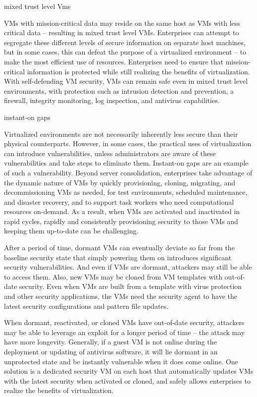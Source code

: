 mixed trust level Vms

VMs with mission-critical data may reside on the same host as VMs with less critical data – resulting in mixed trust level VMs. Enterprises can attempt to segregate these different levels of secure information on separate host machines, but in some cases, this can defeat the purpose of a virtualized environment – to make the most efficient use of resources. Enterprises need to ensure that mission-critical information is protected while still realizing the benefits of virtualization. With self-defending VM security, VMs can remain safe even in mixed trust level environments, with protection such as intrusion detection and prevention, a firewall, integrity monitoring, log inspection, and antivirus capabilities.

instant-on gaps

Virtualized environments are not necessarily inherently less secure than their physical counterparts. However, in some cases, the practical uses of virtualization can introduce vulnerabilities, unless administrators are aware of these vulnerabilities and take steps to eliminate them. Instant-on gaps are an example of such a vulnerability.
Beyond server consolidation, enterprises take advantage of the dynamic nature of VMs by quickly provisioning, cloning, migrating, and decommissioning VMs as needed, for test environments, scheduled maintenance, and disaster recovery, and to support task workers who need computational resources on-demand. As a result, when VMs are activated and inactivated in rapid cycles, rapidly and consistently provisioning security to those VMs and keeping them up-to-date can be challenging.

After a period of time, dormant VMs can eventually deviate so far from the baseline security state that simply powering them on introduces significant security vulnerabilities. And even if VMs are dormant, attackers may still be able to access them. Also, new VMs may be cloned from VM templates with out-of-date security. Even when VMs are built from a template with virus protection and other security applications, the VMs need the security agent to have the latest security configurations and pattern file updates.

When dormant, reactivated, or cloned VMs have out-of-date security, attackers may be able to leverage an exploit for a longer period of time – the attack may have more longevity. Generally, if a guest VM is not online during the deployment or updating of antivirus software, it will lie dormant in an unprotected state and be instantly vulnerable when it does come online. One solution is a dedicated security VM on each host that automatically updates VMs with the latest security when activated or cloned, and safely allows enterprises to realize the benefits of virtualization.

